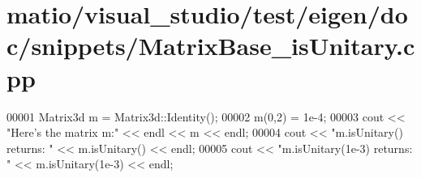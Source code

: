 \hypertarget{matio_2visual__studio_2test_2eigen_2doc_2snippets_2_matrix_base__is_unitary_8cpp_source}{}\section{matio/visual\+\_\+studio/test/eigen/doc/snippets/\+Matrix\+Base\+\_\+is\+Unitary.cpp}
\label{matio_2visual__studio_2test_2eigen_2doc_2snippets_2_matrix_base__is_unitary_8cpp_source}

\begin{DoxyCode}
00001 Matrix3d m = Matrix3d::Identity();
00002 m(0,2) = 1e-4;
00003 cout << \textcolor{stringliteral}{"Here's the matrix m:"} << endl << m << endl;
00004 cout << \textcolor{stringliteral}{"m.isUnitary() returns: "} << m.isUnitary() << endl;
00005 cout << \textcolor{stringliteral}{"m.isUnitary(1e-3) returns: "} << m.isUnitary(1e-3) << endl;
\end{DoxyCode}
